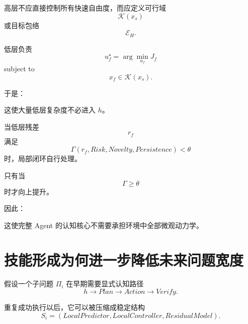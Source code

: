 高层不应直接控制所有快速自由度，而应定义可行域
\begin{equation}
\mathcal K(x_s)
\end{equation}
或目标包络
\begin{equation}
\mathcal E_H.
\end{equation}

低层负责
\begin{equation}
u_f^\star
=
\arg\min_{u_f}
J_f
\end{equation}
subject to
\begin{equation}
x_f\in\mathcal K(x_s).
\end{equation}

于是：

\begin{statementbox}
\centering
{}
\end{statementbox}

这使大量低层复杂度不必进入 $h$。

当低层残差
\begin{equation}
r_f
\end{equation}
满足
\begin{equation}
\Gamma(r_f,Risk,Novelty,Persistence)
<
\theta
\end{equation}
时，局部闭环自行处理。

只有当
\begin{equation}
\Gamma
\geq
\theta
\end{equation}
时才向上提升。

因此：

\begin{statementbox}
\centering
{}
\end{statementbox}

这使完整 Agent 的认知核心不需要承担环境中全部微观动力学。

\section{技能形成为何进一步降低未来问题宽度}

假设一个子问题 $\Pi_i$ 在早期需要显式认知路径
\begin{equation}
h
\rightarrow
Plan
\rightarrow
Action
\rightarrow
Verify.
\end{equation}

重复成功执行以后，它可以被压缩成稳定结构
\begin{equation}
S_i
=
(LocalPredictor,LocalController,ResidualModel).
\end{equation}

